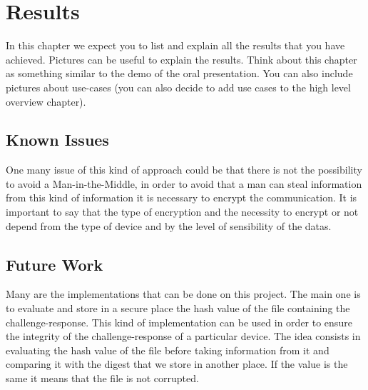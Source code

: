 \chapter{Results}
In this chapter we expect you to list and explain all the results that you have achieved. Pictures can be useful to explain the results. Think about this chapter as something similar to the demo of the oral presentation. You can also include pictures about use-cases (you can also decide to add use cases to the high level overview chapter).
\section{Known Issues}
One many issue of this kind of approach could be that there is not the possibility to avoid a Man-in-the-Middle, in order to avoid that a man can steal information from this kind of information it is necessary to encrypt the communication.
It is important to say that the type of encryption and the necessity to encrypt or not depend from the type of device and by the level of sensibility of the datas.


\section{Future Work}
Many are the implementations that can be done on this project.
The main one is to evaluate and store in a secure place the hash value of the file containing the challenge-response.
This kind of implementation can be used in order to ensure the integrity of the challenge-response of a particular device.
The idea consists in evaluating the hash value of the file before taking information from it and comparing it with the digest that we store in another place.
If the value is the same it means that the file is not corrupted.

